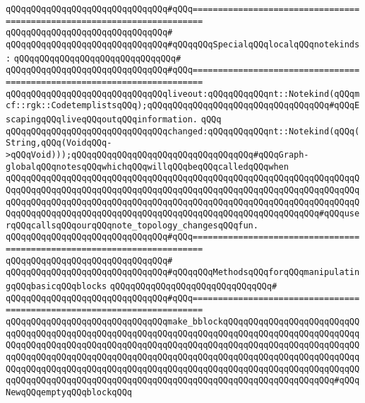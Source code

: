 \verb|qQQqqQQqqQQqqQQqqQQqqQQqqQQqqQQq#qQQq========================================================================|\newline
\verb|qQQqqQQqqQQqqQQqqQQqqQQqqQQqqQQq#|\newline
\verb|qQQqqQQqqQQqqQQqqQQqqQQqqQQqqQQq#qQQqqQQqSpecialqQQqlocalqQQqnotekinds:|\newline
\verb|qQQqqQQqqQQqqQQqqQQqqQQqqQQqqQQq#|\newline
\verb|qQQqqQQqqQQqqQQqqQQqqQQqqQQqqQQq#qQQq========================================================================|\newline
\newline
\verb|qQQqqQQqqQQqqQQqqQQqqQQqqQQqqQQqliveout:qQQqqQQqqQQqnt::Notekind(qQQqmcf::rgk::CodetemplistsqQQq);qQQqqQQqqQQqqQQqqQQqqQQqqQQqqQQqqQQq#qQQqEscapingqQQqliveqQQqoutqQQqinformation.|\newline
\verb|qQQq|\newline
\verb|qQQqqQQqqQQqqQQqqQQqqQQqqQQqqQQqchanged:qQQqqQQqqQQqnt::Notekind(qQQq(String,qQQq(VoidqQQq->qQQqVoid)));qQQqqQQqqQQqqQQqqQQqqQQqqQQqqQQqqQQq#qQQqGraph-globalqQQqnotesqQQqwhichqQQqwillqQQqbeqQQqcalledqQQqwhen|\newline
\verb|qQQqqQQqqQQqqQQqqQQqqQQqqQQqqQQqqQQqqQQqqQQqqQQqqQQqqQQqqQQqqQQqqQQqqQQqqQQqqQQqqQQqqQQqqQQqqQQqqQQqqQQqqQQqqQQqqQQqqQQqqQQqqQQqqQQqqQQqqQQqqQQqqQQqqQQqqQQqqQQqqQQqqQQqqQQqqQQqqQQqqQQqqQQqqQQqqQQqqQQqqQQqqQQqqQQqqQQqqQQqqQQqqQQqqQQqqQQqqQQqqQQqqQQqqQQqqQQqqQQqqQQqqQQqqQQq#qQQquserqQQqcallsqQQqourqQQqnote_topology_changesqQQqfun.|\newline
\newline
\verb|qQQqqQQqqQQqqQQqqQQqqQQqqQQqqQQq#qQQq========================================================================|\newline
\verb|qQQqqQQqqQQqqQQqqQQqqQQqqQQqqQQq#|\newline
\verb|qQQqqQQqqQQqqQQqqQQqqQQqqQQqqQQq#qQQqqQQqMethodsqQQqforqQQqmanipulatingqQQqbasicqQQqblocks|\newline
\verb|qQQqqQQqqQQqqQQqqQQqqQQqqQQqqQQq#|\newline
\verb|qQQqqQQqqQQqqQQqqQQqqQQqqQQqqQQq#qQQq========================================================================|\newline
\verb|qQQqqQQqqQQqqQQqqQQqqQQqqQQqqQQqmake_bblockqQQqqQQqqQQqqQQqqQQqqQQqqQQqqQQqqQQqqQQqqQQqqQQqqQQqqQQqqQQqqQQqqQQqqQQqqQQqqQQqqQQqqQQqqQQqqQQqqQQqqQQqqQQqqQQqqQQqqQQqqQQqqQQqqQQqqQQqqQQqqQQqqQQqqQQqqQQqqQQqqQQqqQQqqQQqqQQqqQQqqQQqqQQqqQQqqQQqqQQqqQQqqQQqqQQqqQQqqQQqqQQqqQQqqQQqqQQqqQQqqQQqqQQqqQQqqQQqqQQqqQQqqQQqqQQqqQQqqQQqqQQqqQQqqQQqqQQqqQQqqQQqqQQqqQQqqQQqqQQqqQQqqQQqqQQqqQQqqQQqqQQqqQQqqQQqqQQqqQQqqQQqqQQqqQQq#qQQqNewqQQqemptyqQQqblockqQQq|\newline
